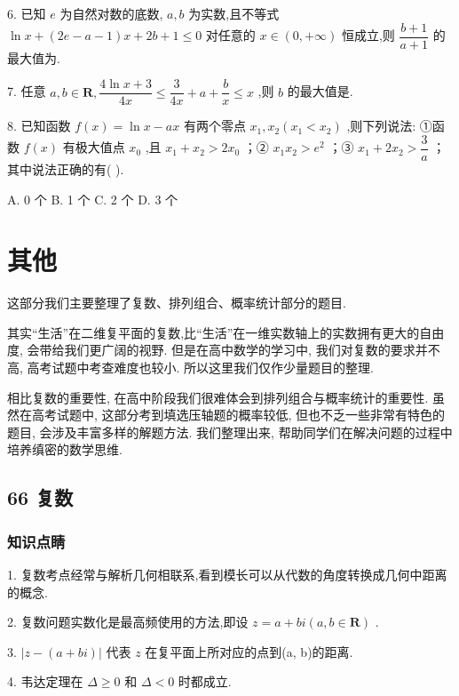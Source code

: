 6. 已知 ${e}$ 为自然对数的底数, $a,b$ 为实数,且不等式 $\ln x + \left( {2{e} - a - 1}\right) x + {2b} + 1 \leq  0$ 对任意的 $x \in  \left( {0, + \infty }\right)$ 恒成立,则 $\dfrac{b + 1}{a + 1}$ 的最大值为\blkda{}.

7. 任意 $a,b \in  \mathbf{R},\dfrac{4\ln x + 3}{4x} \leq  \dfrac{3}{4x} + a + \dfrac{b}{x} \leq  x$ ,则 $b$ 的最大值是\blkda{}.

8. 已知函数 $f\left( x\right)  = \ln x - {ax}$ 有两个零点 ${x}_{1},{x}_{2}\left( {{x}_{1} < {x}_{2}}\right)$ ,则下列说法: ①函数 $f\left( x\right)$ 有极大值点 ${x}_{0}$ ,且 ${x}_{1} + {x}_{2} > 2{x}_{0}$ ；② ${x}_{1}{x}_{2} > {{e}}^{2}$ ；③ ${x}_{1} + 2{x}_{2} > \dfrac{3}{a}$ ； 其中说法正确的有(   ).

A. 0 个 B. 1 个 C. 2 个 D. 3 个

\section*{其他}

这部分我们主要整理了复数、排列组合、概率统计部分的题目.

其实“生活”在二维复平面的复数,比“生活”在一维实数轴上的实数拥有更大的自由度, 会带给我们更广阔的视野. 但是在高中数学的学习中, 我们对复数的要求并不高, 高考试题中考查难度也较小. 所以这里我们仅作少量题目的整理.

相比复数的重要性, 在高中阶段我们很难体会到排列组合与概率统计的重要性. 虽然在高考试题中, 这部分考到填选压轴题的概率较低, 但也不乏一些非常有特色的题目, 会涉及丰富多样的解题方法. 我们整理出来, 帮助同学们在解决问题的过程中培养缜密的数学思维.

\subsection*{66 复数}

\subsubsection*{知识点睛}

1. 复数考点经常与解析几何相联系,看到模长可以从代数的角度转换成几何中距离的概念.

2. 复数问题实数化是最高频使用的方法,即设 $z = a + b{i}\left( {a,b \in  \mathbf{R}}\right)$ .

3. $\left| {z - \left( {a + b{i}}\right) }\right|$ 代表 $z$ 在复平面上所对应的点到(a, b)的距离.

4. 韦达定理在 $\Delta  \geq  0$ 和 $\Delta  < 0$ 时都成立.

